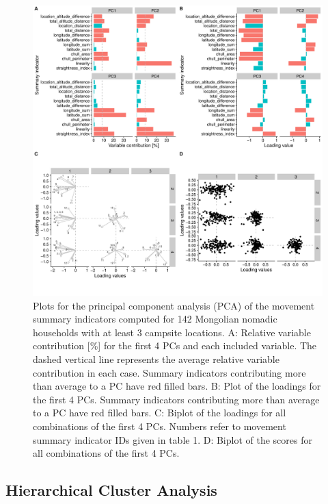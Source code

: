 \documentclass[]{elsarticle} %
\begin{document}
\begin{figure}[H]

{\centering \includegraphics[width=\textwidth]{./../figures/si_pca_plots_derived} 

}

\caption{Plots for the principal component analysis (PCA) of the movement summary indicators computed for 142 Mongolian nomadic households with at least 3 campsite locations. A: Relative variable contribution [\%] for the first 4 PCs and each included variable. The dashed vertical line represents the average relative variable contribution in each case. Summary indicators contributing more than average to a PC have red filled bars. B: Plot of the loadings for the first 4 PCs. Summary indicators contributing more than average to a PC have red filled bars. C: Biplot of the loadings for all combinations of the first 4 PCs. Numbers refer to movement summary indicator IDs given in table 1. D: Biplot of the scores for all combinations of the first 4 PCs.}\label{fig:si-pca-plots-preparation}
\end{figure}

\hypertarget{hierarchical-cluster-analysis-1}{%
\subsection{Hierarchical Cluster
Analysis}\label{hierarchical-cluster-analysis-1}}
\end{document}

